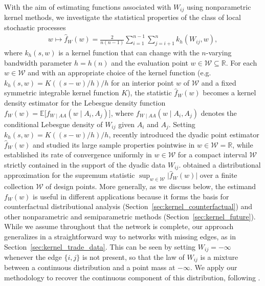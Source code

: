 \documentclass[11pt,lof]{puthesis}
\newcommand{\R}{\ensuremath{\mathbb{R}}}
\newcommand{\E}{\ensuremath{\mathbb{E}}}
\newcommand{\cW}{\ensuremath{\mathcal{W}}}
\theoremstyle{break}
\theoremstyle{proof}
\begin{document}
With the aim of estimating functions associated with $W_{i j}$
using nonparametric kernel methods, we investigate the statistical
properties of the class of local stochastic processes
%
\begin{align}\label{eq:kernel_estimator}
  w \mapsto \hat{f}_W(w)
  = \frac{2}{n(n-1)} \sum_{i=1}^{n-1} \sum_{j=i+1}^n k_h(W_{i j},w),
\end{align}
%
where $k_h(s,w)$ is a kernel function that can change with the $n$-varying
bandwidth parameter $h=h(n)$ and the evaluation point $w \in \cW\subseteq \R$.
For each $w\in\cW$ and with an appropriate choice of the kernel function
(e.g.\ $k_h(s,w)=K((s-w)/h)/h$ for an interior point $w$ of $\cW$ and a
fixed symmetric integrable kernel function $K$), the statistic $\hat{f}_W(w)$
becomes a kernel density estimator for the Lebesgue density function
$f_W(w) = \E\big[f_{W \mid AA}(w \mid A_i,A_j)\big]$, where
$f_{W \mid AA}(w \mid A_i,A_j)$ denotes the conditional Lebesgue density of
$W_{i j}$ given $A_i$ and $A_j$. Setting $k_h(s,w)=K((s-w)/h)/h$,
\citet{graham2024kernel} recently introduced the dyadic point estimator
$\hat{f}_W(w)$ and studied its large sample properties pointwise in
$w\in\cW=\mathbb{R}$, while \citet{chiang2020empirical} established its rate of
convergence uniformly in $w\in\cW$ for a compact interval $\cW$ strictly
contained in the support of the dyadic data $W_{i j}$.
\citet{chiang2022inference} obtained a distributional approximation for the
supremum statistic $\sup_{w\in\cW}\big|\hat{f}_W(w)\big|$ over a finite
collection $\cW$ of design points. More generally, as we discuss below, the
estimand $f_W(w)$ is useful in different applications because it forms the
basis for counterfactual distributional analysis
(Section~\ref{sec:kernel_counterfactual}) and other nonparametric and
semiparametric methods (Section~\ref{sec:kernel_future}). While we assume
throughout that the network is complete, our approach generalizes in a
straightforward way to networks with missing edges, as in
Section~\ref{sec:kernel_trade_data}.
This can be
seen by setting $W_{i j} = -\infty$ whenever the edge $\{i, j\}$ is not
present, so that the law of $W_{i j}$ is a mixture between a continuous
distribution and a point mass at $-\infty$. We apply our methodology to
recover the continuous component of this distribution, following
\citet{chiang2022inference}.
\end{document}
